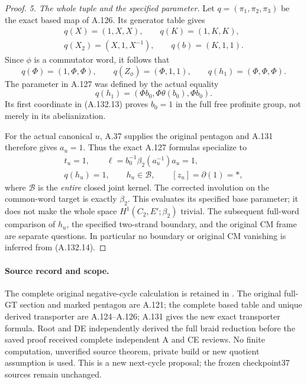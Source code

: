 \begin{proof}
\par\smallskip\noindent\emph{5. The whole tuple and the specified parameter.}
Let \(q=(\pi_1,\pi_2,\pi_3)\) be the exact based map of A.126.
Its generator table gives
\[
\begin{gathered}
 q(X)=(1,X,X),\qquad q(K)=(1,K,K),\\
 q(X_2)=(X,1,X^{-1}),\qquad q(b)=(K,1,1).
\end{gathered}
\]
Since \(\phi\) is a commutator word, it follows that
\[
 q(\Phi)=(1,\Phi,\Phi),\qquad
 q(Z_\phi)=(\Phi,1,1),\qquad
 q(h_1)=(\Phi,\Phi,\Phi).
 \tag{A.132.13}
\]
The parameter in A.127 was defined by the actual equality
\[
 q(h_1)=(\Phi b_0,\Phi\theta(b_0),\Phi b_0).
\]
Its first coordinate in (A.132.13) proves \(b_0=1\) in the
full free profinite group, not merely in its abelianization.

For the actual canonical \(u\), A.37 supplies the original
pentagon and A.131 therefore gives \(a_u=1\). Thus the exact
A.127 formulas specialize to
\[
\begin{gathered}
 t_u=1,\qquad
 \ell=b_0^{-1}\beta_2(a_u^{-1})a_u=1,\\
 q(h_u)=1,\qquad h_u\in\mathcal B,\qquad
 [z_u]=\partial(1)=*,
\end{gathered}                                             \tag{A.132.14}
\]
where \(\mathcal B\) is the \emph{entire} closed joint kernel.
The corrected involution on the common-word target is exactly
\(\beta_2\). This evaluates its specified base parameter; it
does not make the whole space \(H^1(C_2,E';\beta_2)\) trivial.
The subsequent full-word comparison of \(h_u\), the specified
two-strand boundary, and the original CM frame are separate
questions. In particular no boundary or original CM vanishing
is inferred from (A.132.14).
\end{proof}

\paragraph{Source record and scope.}
The complete original negative-cycle calculation is retained in
.
The original full-GT section and marked pentagon are A.121;
the complete based table and unique derived transporter are
A.124--A.126; A.131 gives the new exact transporter formula.
Root and DE independently derived the full braid reduction before
the saved proof received complete independent A and CE reviews.
No finite computation, unverified source theorem, private build or
new quotient assumption is used. This is a new next-cycle proposal;
the frozen checkpoint37 sources remain unchanged.
